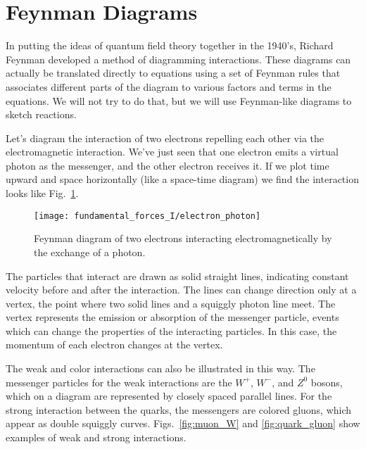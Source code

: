 \section{Feynman Diagrams}
\label{section:feynman}

In putting the ideas of quantum field theory together in the
1940's, Richard Feynman developed a method of diagramming
interactions. These diagrams can actually be translated directly
to equations using a set of Feynman rules that associates
different parts of the diagram to various factors and terms in the
equations.  We will not try to do that, but we will use
Feynman-like diagrams to sketch reactions.

Let's diagram the interaction of two electrons repelling each
other via the electromagnetic interaction.  We've just seen that
one electron emits a virtual photon as the messenger, and the
other electron receives it.  If we plot time upward and space
horizontally (like a space-time diagram) we find the interaction
looks like Fig.~\ref{fig:electron_photon}.


\begin{figure}[b]
\begin{center}
\texttt{[image: fundamental\_forces\_I/electron\_photon]}
\caption{Feynman diagram of two electrons interacting
electromagnetically by the exchange of a photon.}
\label{fig:electron_photon}
\end{center}
\end{figure}

The particles that interact are drawn as solid straight lines,
indicating constant velocity before and after the interaction. The
lines can change direction only at a vertex, the point where two
solid lines and a squiggly photon line meet.  The vertex
represents the emission or absorption of the messenger particle,
events which can change the properties of the interacting
particles.  In this case, the momentum of each electron changes at
the vertex.

The weak and color interactions can also be illustrated in this
way. The messenger particles for the weak interactions are the
$W^+$, $W^-$, and $Z^0$ bosons, which on a diagram are represented
by closely spaced parallel lines.  For the strong interaction
between the quarks, the messengers are colored gluons, which
appear as double squiggly curves.  Figs.~\ref{fig:muon_W} and
\ref{fig:quark_gluon} show examples of weak and strong
interactions.

